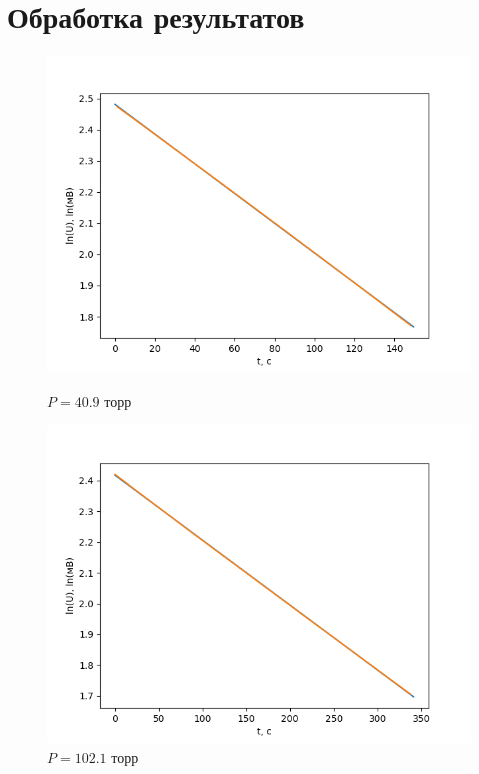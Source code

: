 \documentclass[a4paper]{article}
\begin{document}
\newpage
\section{Обработка результатов}

\begin{figure}[!htb]
  \includegraphics[width=\linewidth]{40.9.png}
  \caption{$P = 40.9$ торр}
\endminipage\hfill
{}
  \includegraphics[width=\linewidth]{102.1.png}
  \caption{$P = 102.1$ торр}
\endminipage\hfill
\end{figure}
\end{document}
